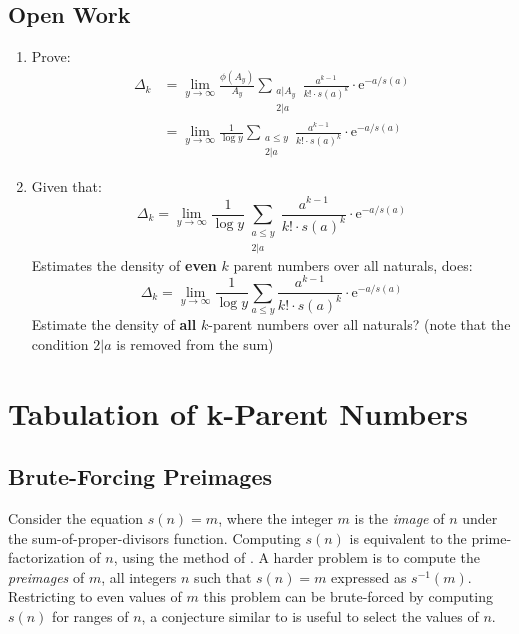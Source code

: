 \documentclass{article}
\theoremstyle{definition}
\begin{document}
\subsection{Open Work}
\begin{enumerate}
    \item Prove: \begin{align*}
              \Delta_k & = \lim_{y \to \infty} \frac{\phi(A_y)}{A_y} \sum_{\substack{a | A_y \\ 2 | a}} \frac{a^{k-1}}{k! \cdot s(a)^k} \cdot \text{e}^{-a/s(a)}\\
                       & = \lim_{y \to \infty} \frac{1}{\log y}\sum_{\substack{a\leq y       \\ 2 | a}} \frac{a^{k-1}}{k! \cdot s(a)^k} \cdot \text{e}^{-a/s(a)}
          \end{align*}

    \item Given that: $$\Delta_k = \lim_{y \to \infty} \frac{1}{\log y}\sum_{\substack{a\leq y \\ 2 | a}} \frac{a^{k-1}}{k! \cdot s(a)^k} \cdot \text{e}^{-a/s(a)}$$
          Estimates the density of \textbf{even} $k$ parent numbers over all naturals, does:$$\Delta_k = \lim_{y \to \infty} \frac{1}{\log y}\sum_{a\leq y} \frac{a^{k-1}}{k! \cdot s(a)^k} \cdot \text{e}^{-a/s(a)}$$ Estimate the density of \textbf{all} $k$-parent numbers over all naturals? (note that the condition $2|a$ is removed from the sum)
\end{enumerate}


\section{Tabulation of k-Parent Numbers}
\subsection{Brute-Forcing Preimages}
Consider the equation $s(n) = m$, where the integer $m$ is the \textit{image} of $n$ under the sum-of-proper-divisors function. Computing $s(n)$ is equivalent to the prime-factorization of $n$, using the method of \cite{compute_sumdiv}. A harder problem is to compute the \textit{preimages} of $m$, all integers $n$ such that $s(n) = m$ expressed as $s^{-1}(m)$. Restricting to even values of $m$ this problem can be brute-forced by computing $s(n)$ for ranges of $n$, a conjecture similar to \cite{sumdiv_range} is useful to select the values of $n$.
\end{document}
